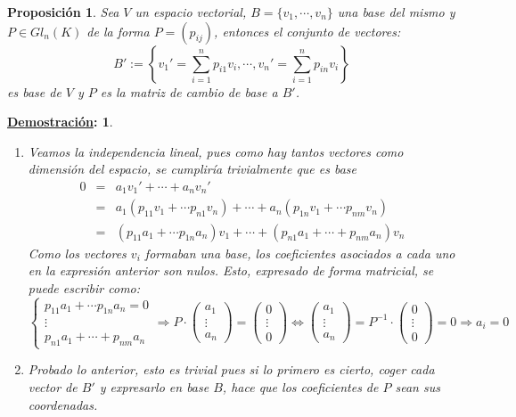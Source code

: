 \documentclass[10pt,a4paper,openright]{book}
\theoremstyle{break}
\newtheorem*{prop}{Proposición}
\newtheorem*{demo}{\underline{Demostración}:}
\begin{document}
\begin{prop}
Sea $V$ un espacio vectorial, $B = \{v_1, \cdots, v_n\}$ una base del mismo y $P\in Gl_n(K)$ de  la forma $P=(p_{ij})$, entonces el conjunto de vectores:
$$
B' := \left\lbrace v_1'=\sum_{i=1}^np_{i1}v_i, \cdots , v_n'=\sum_{i=1}^n p_{in}v_i\right\rbrace
$$
es base de $V$ y $P$ es la matriz de cambio de base a $B'$.
\end{prop}
\begin{demo}
\begin{enumerate}
\item Veamos la independencia lineal, pues como hay tantos vectores como dimensión del espacio, se cumpliría trivialmente que es base
\begin{eqnarray*}
0
&=& a_1v_1'+\cdots+ a_nv_n' \\
&=& a_1(p_{11}v_1+\cdots p_{n1}v_n)+\cdots +a_n(p_{1n}v_1+\cdots p_{nm}v_n) \\
&=& (p_{11}a_1+\cdots p_{1n}a_n)v_1+\cdots +(p_{n1}a_1+\cdots +p_{nm}a_n)v_n
\end{eqnarray*}
Como los vectores $v_i$ formaban una base, los coeficientes asociados a cada uno en la expresión anterior son nulos. Esto, expresado de forma matricial, se puede escribir como:
$$
\begin{cases}
p_{11}a_1+\cdots p_{1n}a_n=0 \\
\vdots \\
p_{n1}a_1+\cdots +p_{nm}a_n
\end{cases}\Rightarrow P\cdot \begin{pmatrix} a_1 \\ \vdots \\ a_n\end{pmatrix}= \begin{pmatrix} 0 \\ \vdots \\ 0\end{pmatrix}\Leftrightarrow   \begin{pmatrix} a_1 \\ \vdots \\ a_n\end{pmatrix}= P^{-1}\cdot \begin{pmatrix} 0 \\ \vdots \\ 0\end{pmatrix}=0\Rightarrow  a_i=0 $$

\item Probado lo anterior, esto es trivial pues si lo primero es cierto, coger cada vector de $B'$ y expresarlo en base $B$, hace que los coeficientes de $P$ sean sus coordenadas.
\end{enumerate}
\end{demo}
\end{document}
